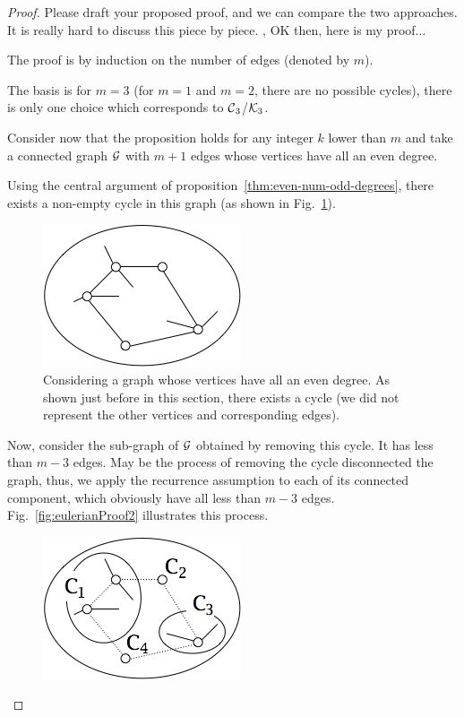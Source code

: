\begin{proof}
{\Arny Please draft your proposed proof, and we can compare the two approaches.  It is
really hard to discuss this piece by piece.}
{\Denis, OK then, here is my proof...}

The proof is by induction on the number of edges (denoted by $m$).

The basis is for $m=3$ (for $m=1$ and $m=2$, there are no possible cycles),
there is only one choice which corresponds to $\mbox{$\cal C$}_3$/$\mbox{$\cal K$}_3$.

Consider now that the proposition holds for any integer $k$ lower than $m$ and
take a connected graph $\mbox{$\cal G$}$ with $m+1$ edges whose vertices have all an even degree.

Using the central argument of proposition~\ref{thm:even-num-odd-degrees},
there exists a non-empty cycle in this graph (as shown in Fig.~\ref{fig:eulerianProof1}). 
\begin{figure}[hbt]
\begin{center}
       \includegraphics[scale=0.5]{FiguresGraph/EulerianProof1}
       \caption{Considering a graph whose vertices have all an even degree.
       As shown just before in this section, there exists a cycle (we did not represent the other vertices and corresponding edges).}
  \label{fig:eulerianProof1}
\end{center}
\end{figure}
Now, consider the sub-graph of $\mbox{$\cal G$}$ obtained by removing this cycle.
It has less than $m-3$ edges.
May be the process of removing the cycle disconnected the graph, thus, we apply
the recurrence assumption to each of its connected component,
which obviously have all less than $m-3$ edges.
Fig.~\ref{fig:eulerianProof2} illustrates this process. 
\begin{figure}[hbt]
\begin{center}
       \includegraphics[scale=0.5]{FiguresGraph/EulerianProof2}

\end{center}
\end{figure}
\end{proof}
